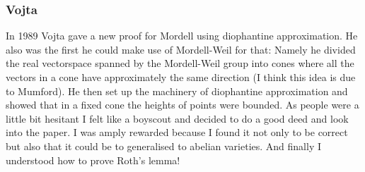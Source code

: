 \documentclass{beamer}
\begin{document}
\begin{frame}
\frametitle{Vojta}
 In 1989 Vojta gave a new proof for Mordell using diophantine approximation. He also was the first he could make use of Mordell-Weil for that: Namely he divided the real vectorspace spanned by the Mordell-Weil group into cones where all the vectors in a cone have approximately the same direction (I think this idea is due to Mumford). He then set up the machinery of diophantine approximation and showed that in a fixed cone the heights of points were bounded. As people were a little bit hesitant I felt like a boyscout and decided to do a good deed and look into the paper. I was amply rewarded because I found it not only to be correct but also that it could be to generalised to abelian varieties. And finally I understood how to prove Roth's lemma!
\end{frame}
\end{document}
